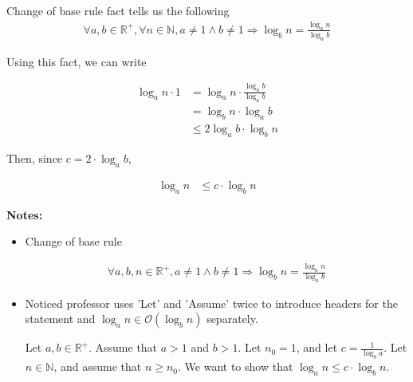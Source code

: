 \documentclass[12pt]{article}
\begin{document}
\begin{enumerate}[a.]
\begin{mdframed}
        \color{red}
        Change of base rule fact tells us the following
        \setcounter{equation}{0}
        \begin{align}
            \forall a,b \in \mathbb{R}^{+}, \forall n \in \mathbb{N},
            a \neq 1 \land b \neq 1 \Rightarrow \log_b n = \frac{\log_a n}{\log_a b}
        \end{align}

        Using this fact, we can write
        \color{black}

        \setcounter{equation}{0}
        \begin{align}
            \log_a n \cdot 1 &= \log_a n \cdot \frac{\log_a b}{\log_a b}\\
            &= \log_b n \cdot \log_a b\\
            &\leq 2 \log_a b \cdot \log_b n
        \end{align}

        \bigskip

        Then, since $c = 2 \cdot \log_a b$,

        \begin{align}
            \log_a n &\leq c \cdot \log_b n
        \end{align}

    \end{mdframed}

    \bigskip

    \textbf{Notes:}

    \begin{itemize}
        \item Change of base rule

        \begin{align}
            \forall a,b,n \in \mathbb{R}^{+}, a \neq 1 \land b \neq 1 \Rightarrow
            \log_b n = \frac{\log_a n}{\log_a b}
        \end{align}

        \item Noticed professor uses 'Let' and 'Assume' twice to introduce headers
        for the statement and $\log_a n \in \mathcal{O}(\log_b n)$ separately.

        \bigskip

        \begin{mdframed}
        Let $a,b \in \mathbb{R}^{+}$. Assume that $a > 1$ and $b > 1$.
        Let $n_0 = 1$, and let $c = \frac{1}{\log_b a}$. Let $n \in \mathbb{N}$,
        and assume that $n \geq n_0$. We want to show that $\log_a n \leq c \cdot \log_b n$.
        \end{mdframed}


\end{itemize}
\end{enumerate}
\end{document}
